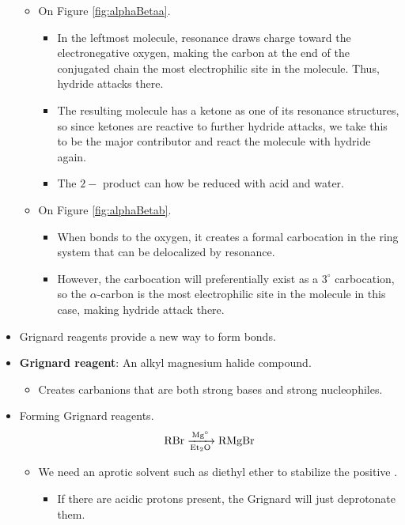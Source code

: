 \documentclass[../notes.tex]{subfiles}
\begin{document}
\begin{itemize}
\begin{itemize}
        \item On Figure \ref{fig:alphaBetaa}.
        \begin{itemize}
            \item In the leftmost molecule, resonance draws charge toward the electronegative oxygen, making the carbon at the end of the conjugated chain the most electrophilic site in the molecule. Thus, hydride attacks there.
            \item The resulting molecule has a ketone as one of its resonance structures, so since ketones are reactive to further hydride attacks, we take this to be the major contributor and react the molecule with hydride again.
            \item The $2-$ product can how be reduced with acid and water.
        \end{itemize}
        \item On Figure \ref{fig:alphaBetab}.
        \begin{itemize}
            \item When  bonds to the oxygen, it creates a formal carbocation in the ring system that can be delocalized by resonance.
            \item However, the carbocation will preferentially exist as a $3^\circ$ carbocation, so the $\alpha$-carbon is the most electrophilic site in the molecule in this case, making hydride attack there.
        \end{itemize}
    \end{itemize}
    \item Grignard reagents provide a new way to form  bonds.
    \item \textbf{Grignard reagent}: An alkyl magnesium halide compound.
    \begin{itemize}
        \item Creates carbanions that are both strong bases and strong nucleophiles.
    \end{itemize}
    \item Forming Grignard reagents.
    \begin{equation*}
        \ce{RBr ->[Mg${}^\circ$][Et2O] RMgBr}
    \end{equation*}
    \begin{itemize}
        \item We need an aprotic solvent such as diethyl ether to stabilize the positive .
        \begin{itemize}
            \item If there are acidic protons present, the Grignard will just deprotonate them.

\end{itemize}
\end{itemize}
\end{itemize}
\end{document}
